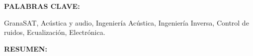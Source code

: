\vspace{0.75cm}


\begin{doublespace}
    \noindent \textbf{PALABRAS CLAVE:}
\end{doublespace}


\begin{singlespace}
    \noindent GranaSAT, Acústica y audio, Ingeniería Acústica, Ingeniería Inversa, Control de ruidos, Ecualización, Electrónica.


\end{singlespace}

\begin{doublespace}
    \noindent \textbf{RESUMEN:}
\end{doublespace}

